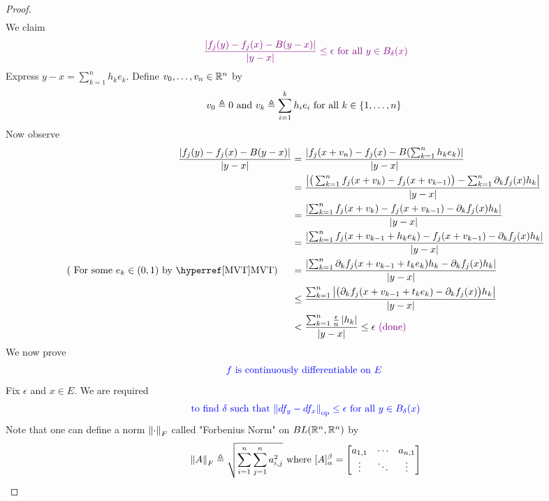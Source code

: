 \documentclass{report}
\begin{document}
\begin{proof}
\begin{align*}
\end{align*}
We claim 
\begin{align*}
  \textcolor{violet}{\frac{\left|f_j(y)-f_j(x)-B(y-x)\right|}{\left|y-x\right|}\leq \epsilon \text{ for all }y \in B_\delta (x)}
\end{align*}
Express $y-x=\sum_{k=1}^n h_ke_k$. Define $v_0,\dots,v_n\in\mathbb{R}^n$ by
\begin{align*}
v_0\triangleq 0\text{ and }v_k\triangleq \sum_{i=1}^k h_ie_i\text{ for all $k\in \left\{ 1,\dots ,n \right\}$ }
\end{align*}
Now observe
\begin{align*}
\frac{\abso{f_j(y)-f_j(x)-B(y-x)}}{\abso{y-x}}&=\frac{\abso{f_j(x+v_n)-f_j(x)-B(\sum_{k=1}^n h_ke_k)}}{\abso{y-x}}\\
&=\frac{\abso{\big(\sum_{k=1}^nf_j(x+v_k)-f_j(x+v_{k-1}) \big)- \sum_{k=1}^n \partial_k f_j(x)h_k   }}{\abso{y-x}}\\
&=\frac{\abso{\sum_{k=1}^n f_j(x+v_k)-f_j(x+v_{k-1})-\partial_k f_j(x)h_k}}{\abso{y-x}}\\
&=\frac{\abso{\sum_{k=1}^n f_j(x+v_{k-1}+h_ke_k)-f_j(x+v_{k-1})-\partial_k f_j(x)h_k}}{\abso{y-x}}\\
(\text{ For some $e_k\in (0,1)$ by \customref{MVT}{MVT}})\hspace{0.5cm}&=\frac{\abso{\sum_{k=1}^n \partial_k f_j(x+v_{k-1}+t_ke_k)h_k-\partial_k f_j(x)h_k}}{\abso{y-x}}\\
&\leq \frac{\sum_{k=1}^n \abso{\big(\partial_k f_j(x+v_{k-1}+t_ke_k)-\partial_k f_j(x) \big)h_k}}{\abso{y-x}}\\
&< \frac{\sum_{k=1}^n \frac{\epsilon }{n} \abso{h_k}}{\abso{y-x}}\leq \epsilon \vdone
\end{align*}
We now prove
\begin{align*}
\textcolor{blue}{f\text{ is continuously differentiable on $E$ }}
\end{align*}
Fix $\epsilon $ and $x\in E$. We are required 
\begin{align*}
\textcolor{blue}{\text{ to find $\delta$ such that $\left\| df_y-df_x \right\|_\text{op}\leq \epsilon $ for all $y\in B_\delta (x)$ }}
\end{align*}
Note that one can define a norm $\left\| \cdot \right\|_F$ called "Forbenius Norm" on $BL(\mathbb{R}^n,\mathbb{R}^n)$ by 
\begin{align*}
\left\| A \right\|_F\triangleq \sqrt{\sum_{i=1}^n \sum_{j=1}^n a_{i,j}^2}  \text{ where }[A]_\alpha ^\beta = \begin{bmatrix}
  a_{1,1}& \cdots & a_{n,1}\\
  \vdots & \ddots & \vdots \\

\end{bmatrix}
\end{align*}
\end{proof}
\end{document}
